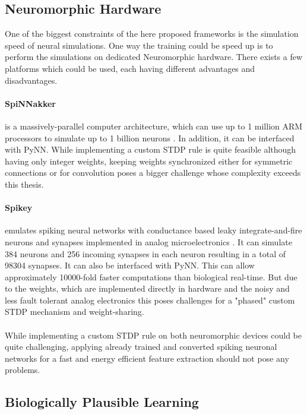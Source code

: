 \subsection{Neuromorphic Hardware} \label{c:neuhard}

One of the biggest constraints of the here proposed frameworks is the simulation speed of neural simulations.
One way the training could be speed up is to perform the simulations on dedicated Neuromorphic hardware. 
There exists a few platforms which could be used, each having different advantages and disadvantages.

\paragraph{SpiNNakker} \label{c:spinnakker}
is a massively-parallel computer architecture, which can use up to 1 million ARM processors to simulate up to 1 billion neurons \cite{jin2008efficient}. 
In addition, it can be interfaced with PyNN. 
While implementing a custom STDP rule is quite feasible although having only integer weights, keeping weights synchronized either for symmetric connections or for convolution poses a bigger challenge whose complexity exceeds this thesis.

\paragraph{Spikey} \label{c:spikey}
emulates spiking neural networks with conductance based leaky integrate-and-fire neurons and synapses implemented in analog microelectronics \cite{Pfeil1311}.
It can simulate 384 neurons and 256 incoming synapses in each neuron resulting in a total of 98304 synapses.
It can also be interfaced with PyNN.
This can allow approximately 10000-fold faster computations than biological real-time.
But due to the weights, which are implemented directly in hardware and the noisy and less fault tolerant analog electronics this poses challenges for a "phased" custom STDP mechanism and weight-sharing. 
\\
\\
While implementing a custom STDP rule on both neuromorphic devices could be quite challenging, applying already trained and converted spiking neuronal networks for a fast and energy efficient feature extraction should not pose any problems.  

\subsection{Biologically Plausible Learning} \label{c:biofuture}

